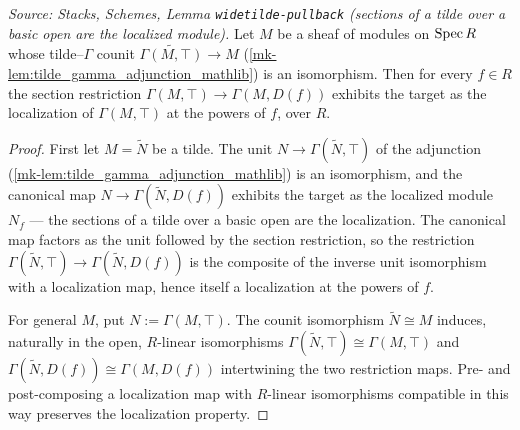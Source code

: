 \begin{lemma}
  \label{mk-lem:isLocalizedModule_restrict_of_isIso_fromTildeΓ}
  \leanok

  \textit{Source: Stacks, Schemes, Lemma \texttt{widetilde-pullback} (sections of a
  tilde over a basic open are the localized module).}
  Let \(M\) be a sheaf of modules on \(\operatorname{Spec} R\) whose tilde--\(\Gamma\) counit
  \(\widetilde{\Gamma(M, \top)} \to M\) (\ref{mk-lem:tilde_gamma_adjunction_mathlib}) is an
  isomorphism. Then for every \(f \in R\) the section restriction
  \(\Gamma(M, \top) \to \Gamma(M, D(f))\) exhibits the target as the localization of
  \(\Gamma(M, \top)\) at the powers of \(f\), over \(R\).
\end{lemma}
\begin{proof}
  \leanok
  First let \(M = \widetilde{N}\) be a tilde. The unit
  \(N \to \Gamma(\widetilde{N}, \top)\) of the adjunction
  (\ref{mk-lem:tilde_gamma_adjunction_mathlib}) is an isomorphism, and the canonical map
  \(N \to \Gamma(\widetilde{N}, D(f))\) exhibits the target as the localized module
  \(N_f\) — the sections of a tilde over a basic open are the localization. The
  canonical map factors as the unit followed by the section restriction, so the
  restriction \(\Gamma(\widetilde{N}, \top) \to \Gamma(\widetilde{N}, D(f))\) is the
  composite of the inverse unit isomorphism with a localization map, hence itself a
  localization at the powers of \(f\).

  For general \(M\), put \(N := \Gamma(M, \top)\). The counit isomorphism
  \(\widetilde{N} \cong M\) induces, naturally in the open, \(R\)-linear isomorphisms
  \(\Gamma(\widetilde{N}, \top) \cong \Gamma(M, \top)\) and
  \(\Gamma(\widetilde{N}, D(f)) \cong \Gamma(M, D(f))\) intertwining the two restriction
  maps. Pre- and post-composing a localization map with \(R\)-linear isomorphisms
  compatible in this way preserves the localization property.
\end{proof}

